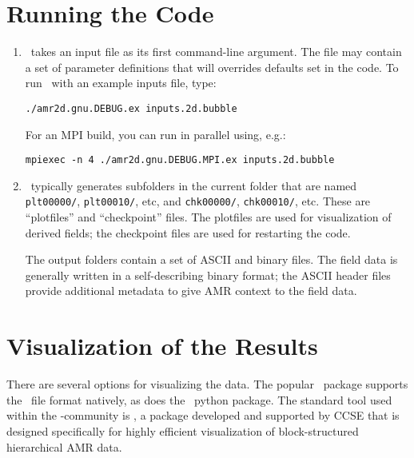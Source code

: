 \section{Running the Code}

\begin{enumerate}

\item \iamr\ takes an input file as its first command-line argument.  The file may
contain a set of parameter definitions that will overrides defaults set in the code.
To run \iamr\ with an example inputs file, type:
\begin{verbatim}
./amr2d.gnu.DEBUG.ex inputs.2d.bubble
\end{verbatim}
For an MPI build, you can run in parallel using, e.g.:
\begin{verbatim}
mpiexec -n 4 ./amr2d.gnu.DEBUG.MPI.ex inputs.2d.bubble
\end{verbatim}

\item \iamr\ typically generates subfolders in the current folder that
  are named {\tt plt00000/}, {\tt plt00010/}, etc, and {\tt chk00000/},
  {\tt chk00010/}, etc. These are ``plotfiles'' and ``checkpoint''
  files. The plotfiles are used for visualization of derived fields; the checkpoint
  files are used for restarting the code.

  The output folders contain a set of ASCII and binary files.  The field
  data is generally written in a self-describing binary format; the 
  ASCII header files provide additional metadata to give AMR context to the field data.

\end{enumerate}

\section{Visualization of the Results}

There are several options for visualizing the data.  The popular
\visit\ package supports the \amrex\ file format natively, as does
the \yt\ python package.  The standard tool used within the
\amrex-community is \amrvis, a package developed and supported 
by CCSE that is designed specifically for highly efficient visualization
of block-structured hierarchical AMR data.

